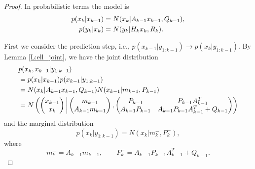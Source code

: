 \begin{proof}
In probabilistic terms the model is
\begin{align}
  p(x_k|x_{k-1}) &= N(x_k| A_{k-1}x_{k-1}, Q_{k-1}), \notag \\
  p(y_k|x_k) &= N(y_k| H_kx_k, R_k).
\end{align}

First we consider the prediction step, i.e., 
$p(x_{k-1}|y_{1:k-1}) \to p(x_k|y_{1:k-1})$.
By Lemma \ref{L:ell_joint}, we have the joint distribution
\begin{align}
  & p(x_k,x_{k-1}|y_{1:k-1}) \notag \\
	&= p(x_k|x_{k-1}) p(x_{k-1} | y_{1:k-1}) \notag \\
	&= N(x_k | A_{k-1}x_{k-1}, Q_{k-1}) N(x_{k-1} | m_{k-1}, P_{k-1}) \notag \\
	&= N\left(
	    \begin{pmatrix}
		  x_{k-1} \\
		  x_k \\
	    \end{pmatrix} \bigg\rvert
	    \begin{pmatrix}
		  m_{k-1}         \\
		  A_{k-1} m_{k-1} \\
	    \end{pmatrix},
	    \begin{pmatrix}
		  P_{k-1}          &  P_{k-1} A_{k-1}^T                    \\
		  A_{k-1} P_{k-1}  &  A_{k-1} P_{k-1} A_{k-1}^T + Q_{k-1}  \\
	    \end{pmatrix} 
	  \right)
\end{align}
and the marginal distribution
\begin{equation}
  p(x_k|y_{1:k-1}) = N(x_k| m_k^-, P_k^-),
\end{equation}
where
\begin{equation}
  m_k^-=A_{k-1}m_{k-1}, \qquad P_k^-= A_{k-1} P_{k-1} A_{k-1}^T + Q_{k-1}.
\end{equation}


\end{proof}
